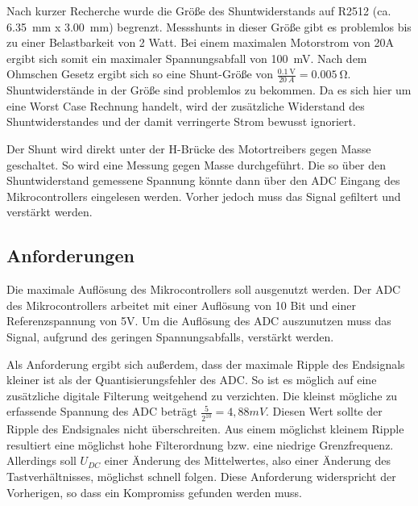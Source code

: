 Nach kurzer Recherche wurde die Größe des Shuntwiderstands auf R2512 (ca. \SI{6,35}{\mm} x \SI{3,00}{\mm}) begrenzt. Messshunts in dieser Größe gibt es problemlos bis zu einer Belastbarkeit von 2 Watt. 
Bei einem maximalen Motorstrom von 20A ergibt sich somit ein maximaler Spannungsabfall von \SI{100}{\mV}. Nach dem Ohmschen Gesetz ergibt sich so eine Shunt-Größe von
$\frac{\SI{0,1}{\V}}{\SI{20}{A}}=\SI{0,005}{\ohm}$. Shuntwiderstände in der Größe sind problemlos zu bekommen.
Da es sich hier um eine Worst Case Rechnung handelt, wird der zusätzliche Widerstand des Shuntwiderstandes und der damit verringerte Strom bewusst ignoriert.

Der Shunt wird direkt unter der H-Brücke des Motortreibers gegen Masse geschaltet. So wird eine Messung gegen Masse durchgeführt. Die so über den Shuntwiderstand gemessene Spannung könnte 
dann über den ADC Eingang des Mikrocontrollers eingelesen werden. Vorher jedoch muss das Signal gefiltert und verstärkt werden.

\subsection{Anforderungen}
Die maximale Auflösung des Mikrocontrollers soll ausgenutzt werden. Der ADC des Mikrocontrollers arbeitet mit einer Auflösung von 10 Bit und einer 
Referenzspannung von 5V. Um die Auflösung des ADC auszunutzen muss das Signal, aufgrund des geringen Spannungsabfalls, verstärkt werden.

Als Anforderung ergibt sich außerdem, dass der maximale Ripple des Endsignals kleiner ist als der Quantisierungsfehler des ADC.
So ist es möglich auf eine zusätzliche digitale Filterung weitgehend zu verzichten.
Die kleinst mögliche zu erfassende Spannung des ADC beträgt $\frac{5}{2^{10}}=4,88mV$.
Diesen Wert sollte der Ripple des Endsignales nicht überschreiten.
Aus einem möglichst kleinem Ripple resultiert eine möglichst hohe Filterordnung bzw. eine niedrige Grenzfrequenz.
Allerdings soll $U_{DC}$ einer Änderung des Mittelwertes, also einer Änderung des Tastverhältnisses, möglichst
schnell folgen. Diese Anforderung widerspricht der Vorherigen, so dass ein Kompromiss gefunden werden muss.

